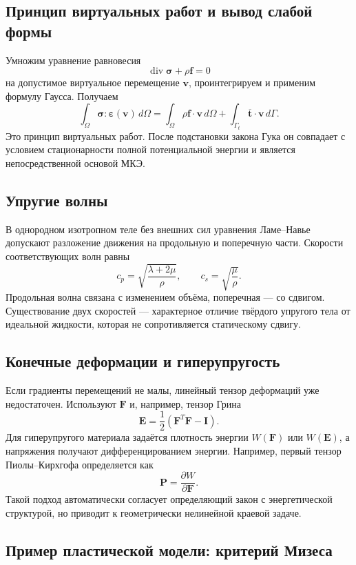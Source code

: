 \subsection{Принцип виртуальных работ и вывод слабой формы}

Умножим уравнение равновесия
\[
    \operatorname{div}\boldsymbol\sigma+\rho\mathbf f=0
\]
на допустимое виртуальное перемещение $\mathbf v$, проинтегрируем и применим
формулу Гаусса. Получаем
\[
    \boxed{
    \int_\Omega
    \boldsymbol\sigma:\boldsymbol\varepsilon(\mathbf v)\,d\Omega
    =\int_\Omega\rho\mathbf f\cdot\mathbf v\,d\Omega
    +\int_{\Gamma_t}\overline{\mathbf t}\cdot\mathbf v\,d\Gamma.
    }
\]
Это принцип виртуальных работ. После подстановки закона Гука он совпадает с
условием стационарности полной потенциальной энергии и является непосредственной
основой МКЭ.

\subsection{Упругие волны}

В однородном изотропном теле без внешних сил уравнения Ламе--Навье допускают
разложение движения на продольную и поперечную части. Скорости соответствующих
волн равны
\[
    \boxed{
    c_p=\sqrt{\frac{\lambda+2\mu}{\rho}},
    \qquad
    c_s=\sqrt{\frac{\mu}{\rho}}.
    }
\]
Продольная волна связана с изменением объёма, поперечная --- со сдвигом.
Существование двух скоростей --- характерное отличие твёрдого упругого тела от
идеальной жидкости, которая не сопротивляется статическому сдвигу.

\subsection{Конечные деформации и гиперупругость}

Если градиенты перемещений не малы, линейный тензор деформаций уже недостаточен.
Используют $\mathbf F$ и, например, тензор Грина
\[
    \mathbf E=\frac12(\mathbf F^T\mathbf F-\mathbf I).
\]
Для гиперупругого материала задаётся плотность энергии $W(\mathbf F)$ или
$W(\mathbf E)$, а напряжения получают дифференцированием энергии. Например,
первый тензор Пиолы--Кирхгофа определяется как
\[
    \mathbf P=\frac{\partial W}{\partial\mathbf F}.
\]
Такой подход автоматически согласует определяющий закон с энергетической
структурой, но приводит к геометрически нелинейной краевой задаче.

\subsection{Пример пластической модели: критерий Мизеса}

